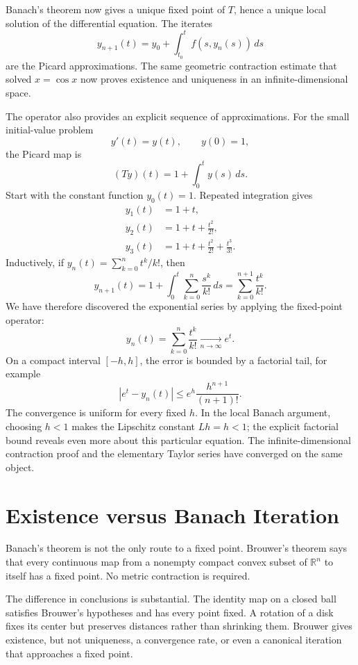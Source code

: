 Banach's theorem now gives a unique fixed point of \(T\), hence a unique local solution of the differential equation.  The iterates
\[
  y_{n+1}(t)
  =y_0+\int_{t_0}^{t}f(s,y_n(s))\,ds
\]
are the Picard approximations.  The same geometric contraction estimate that solved \(x=\cos x\) now proves existence and uniqueness in an infinite-dimensional space.

The operator also provides an explicit sequence of approximations. For the small initial-value problem
\[
 y'(t)=y(t),\qquad y(0)=1,
\]
the Picard map is
\[
 (Ty)(t)=1+\int_0^t y(s)\,ds.
\]
Start with the constant function $y_0(t)=1$. Repeated integration gives
\[
\begin{aligned}
 y_1(t)&=1+t,\\
 y_2(t)&=1+t+\frac{t^2}{2!},\\
 y_3(t)&=1+t+\frac{t^2}{2!}+\frac{t^3}{3!}.
\end{aligned}
\]
Inductively, if $y_n(t)=\sum_{k=0}^{n}t^k/k!$, then
\[
 y_{n+1}(t)
 =1+\int_0^t\sum_{k=0}^{n}\frac{s^k}{k!}\,ds
 =\sum_{k=0}^{n+1}\frac{t^k}{k!}.
\]
We have therefore discovered the exponential series by applying the fixed-point operator:
\[
 \boxed{y_n(t)=\sum_{k=0}^{n}\frac{t^k}{k!}
       \xrightarrow[n\to\infty]{}e^t.}
\]
On a compact interval $[-h,h]$, the error is bounded by a factorial tail, for example
\[
 |e^t-y_n(t)|
 \le e^h\frac{h^{n+1}}{(n+1)!}.
\]
The convergence is uniform for every fixed $h$. In the local Banach argument, choosing $h<1$ makes the Lipschitz constant $Lh=h<1$; the explicit factorial bound reveals even more about this particular equation. The infinite-dimensional contraction proof and the elementary Taylor series have converged on the same object.

\section{Existence versus Banach Iteration}

Banach's theorem is not the only route to a fixed point.  Brouwer's theorem says that every continuous map from a nonempty compact convex subset of \(\mathbb R^n\) to itself has a fixed point.  No metric contraction is required.

The difference in conclusions is substantial.  The identity map on a closed ball satisfies Brouwer's hypotheses and has every point fixed.  A rotation of a disk fixes its center but preserves distances rather than shrinking them.  Brouwer gives existence, but not uniqueness, a convergence rate, or even a canonical iteration that approaches a fixed point.

